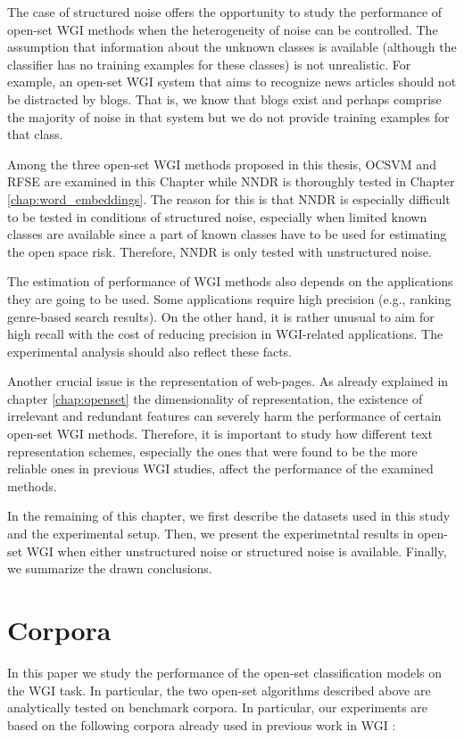 The case of structured noise offers the opportunity to study the performance of open-set WGI methods when the heterogeneity of noise can be controlled. The assumption that information about the unknown classes is available (although the classifier has no training examples for these classes) is not unrealistic. For example, an open-set WGI system that aims to recognize news articles should not be distracted by blogs. That is, we know that blogs exist and perhaps comprise the majority of noise in that system but we do not provide training examples for that class.

Among the three open-set WGI methods proposed in this thesis, OCSVM and RFSE are examined in this Chapter while NNDR is thoroughly tested in Chapter \ref{chap:word_embeddings}. The reason for this is that NNDR is especially difficult to be tested in conditions of structured noise, especially when limited known classes are available since a part of known classes have to be used for estimating the open space risk. Therefore, NNDR is only tested with unstructured noise.

The estimation of performance of WGI methods also depends on the applications they are going to be used. Some applications require high precision (e.g., ranking genre-based search results). On the other hand, it is rather unusual to aim for high recall with the cost of reducing precision in WGI-related applications. The experimental analysis should also reflect these facts.

Another crucial issue is the representation of web-pages. As already explained in chapter \ref{chap:openset} the dimensionality of representation, the existence of irrelevant and redundant features can severely harm the performance of certain open-set WGI methods. Therefore, it is important to study how different text representation schemes, especially the ones that were found to be the more reliable ones in previous WGI studies, affect the performance of the examined methods. 

In the remaining of this chapter, we first describe the datasets used in this study and the experimental setup. Then, we present the experimetntal results in open-set WGI when either unstructured noise or structured noise is available. Finally, we summarize the drawn conclusions.

\section{Corpora}\label{chap:noise:sec:corpora}
In this paper we study the performance of the open-set classification models on the WGI task. In particular, the two open-set algorithms described above are analytically tested on benchmark corpora. In particular, our experiments are based on the following corpora already used in previous work in WGI \parencite{meyer2004genre,santini2007automatic,kanaris2009learning}:

